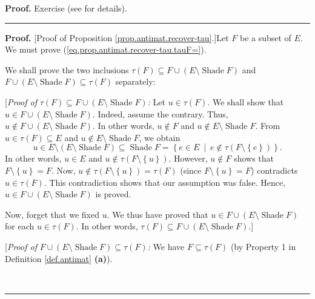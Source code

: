 \documentclass[numbers=enddot,12pt,final,onecolumn]{scrartcl}%
\theoremstyle{definition}
\newenvironment{proof}[1][Proof]{\noindent\textbf{#1.} }{\ \rule{0.5em}{0.5em}}
\newenvironment{verlong}{}{}
\newenvironment{vershort}{}{}
\begin{document}
\begin{vershort}


\begin{proof}
Exercise (see \cite{verlong} for details).
\end{proof}
\end{vershort}

\begin{verlong}


\begin{proof}
[Proof of Proposition \ref{prop.antimat.recover-tau}.]Let $F$ be a subset of
$E$. We must prove (\ref{eq.prop.antimat.recover-tau.tauF=}).

We shall prove the two inclusions $\tau\left(  F\right)  \subseteq
F\cup\left(  E\setminus\operatorname*{Shade}F\right)  $ and $F\cup\left(
E\setminus\operatorname*{Shade}F\right)  \subseteq\tau\left(  F\right)  $ separately:

[\textit{Proof of }$\tau\left(  F\right)  \subseteq F\cup\left(
E\setminus\operatorname*{Shade}F\right)  $\textit{:} Let $u\in\tau\left(
F\right)  $. We shall show that $u\in F\cup\left(  E\setminus
\operatorname*{Shade}F\right)  $. Indeed, assume the contrary. Thus, $u\notin
F\cup\left(  E\setminus\operatorname*{Shade}F\right)  $. In other words,
$u\notin F$ and $u\notin E\setminus\operatorname*{Shade}F$. From $u\in
\tau\left(  F\right)  \subseteq E$ and $u\notin E\setminus
\operatorname*{Shade}F$, we obtain%
\[
u\in E\setminus\left(  E\setminus\operatorname*{Shade}F\right)  \subseteq
\operatorname*{Shade}F=\left\{  e\in E\ \mid\ e\notin\tau\left(
F\setminus\left\{  e\right\}  \right)  \right\}  .
\]
In other words, $u\in E$ and $u\notin\tau\left(  F\setminus\left\{  u\right\}
\right)  $. However, $u\notin F$ shows that $F\setminus\left\{  u\right\}
=F$. Now, $u\notin\tau\left(  F\setminus\left\{  u\right\}  \right)
=\tau\left(  F\right)  $ (since $F\setminus\left\{  u\right\}  =F$)
contradicts $u\in\tau\left(  F\right)  $. This contradiction shows that our
assumption was false. Hence, $u\in F\cup\left(  E\setminus
\operatorname*{Shade}F\right)  $ is proved.

Now, forget that we fixed $u$. We thus have proved that $u\in F\cup\left(
E\setminus\operatorname*{Shade}F\right)  $ for each $u\in\tau\left(  F\right)
$. In other words, $\tau\left(  F\right)  \subseteq F\cup\left(
E\setminus\operatorname*{Shade}F\right)  $.]

[\textit{Proof of }$F\cup\left(  E\setminus\operatorname*{Shade}F\right)
\subseteq\tau\left(  F\right)  $\textit{:} We have $F\subseteq\tau\left(
F\right)  $ (by Property 1 in Definition \ref{def.antimat} \textbf{(a)}).


\end{proof}
\end{verlong}
\end{document}
